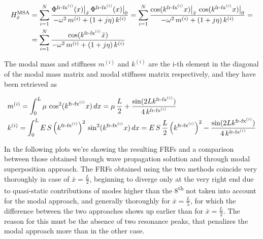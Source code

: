 \documentclass[a4paper,12pt,oneside]{article}
\begin{document}
\[ \begin{split}
	H^\textup{MSA}_{\bar{x}} & =
		\sum_{i=1}^N \frac{\Phi^{\textup{fr-fx}^{(i)}}(x)\big|_{\bar{x}} \,
		\Phi^{\textup{fr-fx}^{(i)}}(x)\big|_0}
		{-\omega^2 \, m^{(i)} + (1 + j \eta) \, k^{(i)}} =
		\sum_{i=1}^N \frac{\cos(k^{\textup{fr-fx}^{(i)}} x)\big|_{\bar{x}} \,
		\cos(k^{\textup{fr-fx}^{(i)}} x)\big|_0}
		{-\omega^2 \, m^{(i)} + (1 + j \eta) \, k^{(i)}} = \\
	& = \sum_{i=1}^N \frac{\cos(k^{\textup{fr-fx}^{(i)}} \bar{x})}
		{-\omega^2 \, m^{(i)} + (1 + j \eta) \, k^{(i)}}
\end{split} \]

\clearpage

The modal mass and stiffness $ m^{(i)} $ and $ k^{(i)} $ are the i-th element in the diagonal of the modal mass matrix and modal stiffness matrix respectively, and they have been retrieved as

\[ \begin{split}
	& m^{(i)} = \int_0^L \mu \, \cos^2(k^{\textup{fr-fx}^{(i)}} x) \, dx =
		\mu \, \frac{L}{2} + \frac{\sin(2 L k^{\textup{fr-fx}^{(i)}})}
		{4 \, k^{\textup{fr-fx}^{(i)}}} \\
	& k^{(i)} = \int_0^L E \, S \, \Bigl(k^{\textup{fr-fx}^{(i)}}\Bigr)^2 \,
		\sin^2(k^{\textup{fr-fx}^{(i)}} x) \, dx =
		E \, S \, \frac{L}{2} \, \Bigl(k^{\textup{fr-fx}^{(i)}}\Bigr)^2 -
		\frac{\sin(2 L k^{\textup{fr-fx}^{(i)}})}{4 \, k^{\textup{fr-fx}^{(i)}}}
\end{split} \]

\vspace{20pt}

In the following plots we're showing the resulting FRFs and a comparison between those obtained through wave propagation solution and through modal superposition approach. The FRFs obtained using the two methods coincide very thoroughly in case of $ \bar{x} = \frac{L}{2} $, beginning to diverge only at the very right end due to quasi-static contributions of modes higher than the 8\textsuperscript{th} not taken into account for the modal approach, and generally thoroughly for $ \bar{x} = \frac{L}{5} $, for which the difference between the two approaches shows up earlier than for $ \bar{x} = \frac{L}{2} $. The reason for this must be the absence of two resonance peaks, that penalizes the modal approach more than in the other case. %
\end{document}
